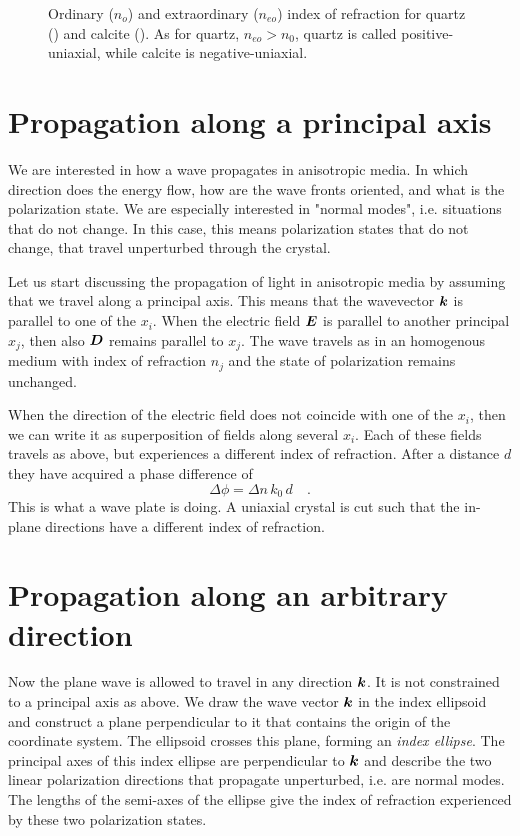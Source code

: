 \begin{figure}
    \caption{Ordinary ($n_o$) and extraordinary ($n_{eo}$) index of refraction for quartz () and calcite (). As for quartz, $n_{eo} > n_0$, quartz is called positive-uniaxial, while calcite is negative-uniaxial.}
\end{figure}



\section{Propagation along a principal axis}

We are interested in how a wave propagates in anisotropic media. In which direction does the energy flow, how are the wave fronts oriented, and what is the polarization state. We are especially interested in "normal modes", i.e. situations that do not change. In this case, this means polarization states that do not change, that travel unperturbed through the crystal.

Let us start discussing the propagation of light in anisotropic media by assuming that we travel along a principal axis. This means that the wavevector $\boldsymbol{k}$ is parallel to one of the $x_i$. When the electric field $\boldsymbol{E}$ is parallel to another principal $x_j$, then also $\boldsymbol{D}$ remains parallel to $x_j$. The wave travels as in an homogenous medium with index of refraction $n_j$ and the state of polarization remains unchanged.

When the direction of the electric field does not coincide with one of the $x_i$, then we can write it as superposition of fields along several $x_i$. Each of these fields travels as above, but  experiences a different index of refraction. After a distance $d$ they  have acquired a phase difference of 
\begin{equation}
    \Delta \phi = \Delta n \, k_0 \, d \quad .
\end{equation}
This is what a wave plate is doing. A uniaxial crystal is cut such that the in-plane directions have a different index of refraction.


\section{Propagation along an arbitrary direction}

Now the plane wave is allowed to travel in any direction $\boldsymbol{k}$. It is not constrained to a principal axis as above. We draw the wave vector $\boldsymbol{k}$ in the index ellipsoid and construct a plane perpendicular to it that contains the origin of the coordinate system. The ellipsoid crosses this plane, forming an \emph{index ellipse}. The principal axes of this index ellipse are perpendicular to $\boldsymbol{k}$ and describe the two linear polarization directions that propagate unperturbed, i.e. are normal modes. The lengths of the semi-axes of the ellipse give the index of refraction experienced by these two polarization states.


